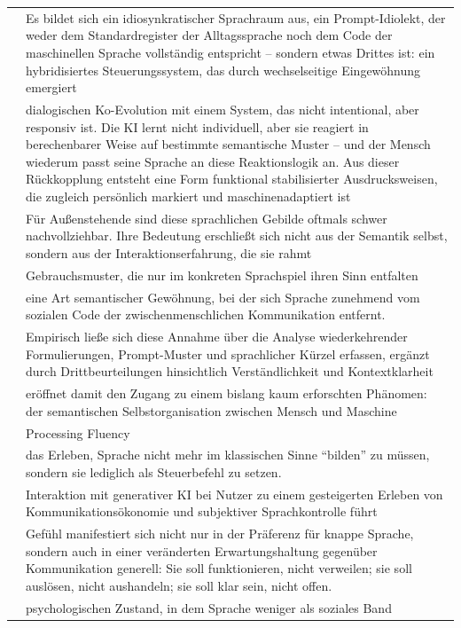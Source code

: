 \documentclass[
  letterpaper,
  DIV=11,
  numbers=noendperiod]{scrartcl}
\begin{document}
\begin{longtable}[]{@{}
  >{\raggedleft\arraybackslash}p{}
  >{\raggedright\arraybackslash}p{}@{}}
43 & Es bildet sich ein idiosynkratischer Sprachraum aus, ein
Prompt-Idiolekt, der weder dem Standardregister der Alltagssprache noch
dem Code der maschinellen Sprache vollständig entspricht -- sondern
etwas Drittes ist: ein hybridisiertes Steuerungssystem, das durch
wechselseitige Eingewöhnung emergiert \\
44 & dialogischen Ko-Evolution mit einem System, das nicht intentional,
aber responsiv ist. Die KI lernt nicht individuell, aber sie reagiert in
berechenbarer Weise auf bestimmte semantische Muster -- und der Mensch
wiederum passt seine Sprache an diese Reaktionslogik an. Aus dieser
Rückkopplung entsteht eine Form funktional stabilisierter
Ausdrucksweisen, die zugleich persönlich markiert und maschinenadaptiert
ist \\
45 & Für Außenstehende sind diese sprachlichen Gebilde oftmals schwer
nachvollziehbar. Ihre Bedeutung erschließt sich nicht aus der Semantik
selbst, sondern aus der Interaktionserfahrung, die sie rahmt \\
46 & Gebrauchsmuster, die nur im konkreten Sprachspiel ihren Sinn
entfalten \\
47 & eine Art semantischer Gewöhnung, bei der sich Sprache zunehmend vom
sozialen Code der zwischenmenschlichen Kommunikation entfernt. \\
48 & Empirisch ließe sich diese Annahme über die Analyse wiederkehrender
Formulierungen, Prompt-Muster und sprachlicher Kürzel erfassen, ergänzt
durch Drittbeurteilungen hinsichtlich Verständlichkeit und
Kontextklarheit \\
49 & eröffnet damit den Zugang zu einem bislang kaum erforschten
Phänomen: der semantischen Selbstorganisation zwischen Mensch und
Maschine \\
50 & Processing Fluency \\
51 & das Erleben, Sprache nicht mehr im klassischen Sinne ``bilden'' zu
müssen, sondern sie lediglich als Steuerbefehl zu setzen. \\
52 & Interaktion mit generativer KI bei Nutzer zu einem gesteigerten
Erleben von Kommunikationsökonomie und subjektiver Sprachkontrolle
führt \\
53 & Gefühl manifestiert sich nicht nur in der Präferenz für knappe
Sprache, sondern auch in einer veränderten Erwartungshaltung gegenüber
Kommunikation generell: Sie soll funktionieren, nicht verweilen; sie
soll auslösen, nicht aushandeln; sie soll klar sein, nicht offen. \\
54 & psychologischen Zustand, in dem Sprache weniger als soziales Band

\end{longtable}
\end{document}
